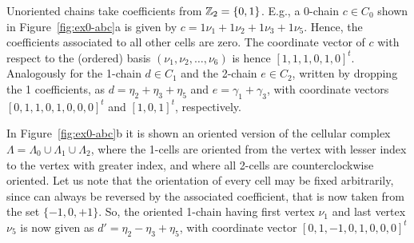 {
\begin{example}[Chains]\label{examplea}
Unoriented chains take coefficients from $\mathbb{Z}_2=\{0,1\}$. E.g., {a} 0-chain $c\in C_0$ shown in Figure~\ref{fig:ex0-abc}a is given by $c = 1\nu_{1} + 1\nu_{2} + 1\nu_{3} + 1\nu_{5}$. Hence, the coefficients associated to all other cells are zero. The coordinate vector of $c$ with respect to the (ordered) basis $(\nu_1, \nu_2, \ldots, \nu_6)$ is hence $[1,1,1,0,1,0]^t$.
Analogously for the 1-chain $d\in C_1$ and the 2-chain $e\in C_2$, written by dropping the 1 coefficients, as $d = \eta_2 + \eta_3 + \eta_5$ and $e = \gamma_1 + \gamma_3$, with coordinate vectors $[0,1,1,0,1,0,0,0]^t$ and $[1,0,1]^t$, respectively.
\end{example}
}


{
\begin{example}[Orientation]\label{examplec}
In Figure~\ref{fig:ex0-abc}b it is shown an oriented version of the cellular complex $\Lambda = \Lambda_0 \cup \Lambda_1 \cup \Lambda_2$, where the 1-cells are oriented from the vertex with lesser index to the vertex with greater index, and where {all 2-cells are counterclockwise oriented}. Let us note that the orientation of every cell may be fixed arbitrarily, since can always be reversed by the associated coefficient, that is now taken from the set  $\{-1,0,+1\}$.  So, the oriented 1-chain having first vertex $\nu_1$ and last vertex $\nu_5$ is now given as $d' = \eta_2 -\eta_3 + \eta_5$, with coordinate vector $[0,1,-1,0,1,0,0,0]^t$
\end{example}
}


